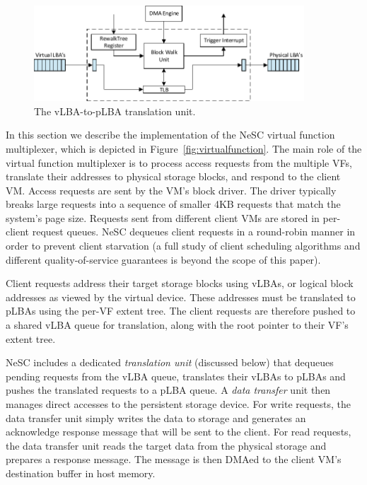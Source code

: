 \begin{figure}[t]
  \vspace{-3ex}
  \centering
  \includegraphics[width=0.9\textwidth]{figs/translation_unit.pdf}
  \caption{The vLBA-to-pLBA translation unit.}
   \label{fig:translation_unit}
\end{figure}

In this section we describe the implementation of the NeSC virtual function multiplexer, which is depicted in Figure~\ref{fig:virtualfunction}. The main role of the  virtual function multiplexer is to process access requests from the multiple VFs, translate their addresses to physical storage blocks, and respond to the client VM.
%
Access requests are sent by the VM's block driver. The driver typically breaks large requests into a sequence of smaller 4KB requests that match the system's page size. Requests sent from different client VMs are stored in per-client request queues. NeSC dequeues client requests in a round-robin manner in order to prevent client starvation (a full study of client scheduling algorithms and different quality-of-service guarantees is beyond the scope of this paper).

Client requests address their target storage blocks using vLBAs, or logical block addresses as viewed by the virtual device. These addresses must be translated to pLBAs using the per-VF extent tree. The client requests are therefore pushed to a shared vLBA queue for translation, along with the root pointer to their VF's extent tree.

NeSC includes a dedicated \emph{translation unit} (discussed below) that dequeues pending requests from the vLBA queue, translates their vLBAs to pLBAs and pushes the translated requests to a pLBA queue. A \emph{data transfer} unit then manages direct accesses to the persistent storage device. For write requests, the data transfer unit simply writes the data to storage and generates an acknowledge response message that will be sent to the client. For read requests, the data transfer unit reads the target data from the physical storage and prepares a response message. The message is then DMAed to the client VM's destination buffer in host memory.

